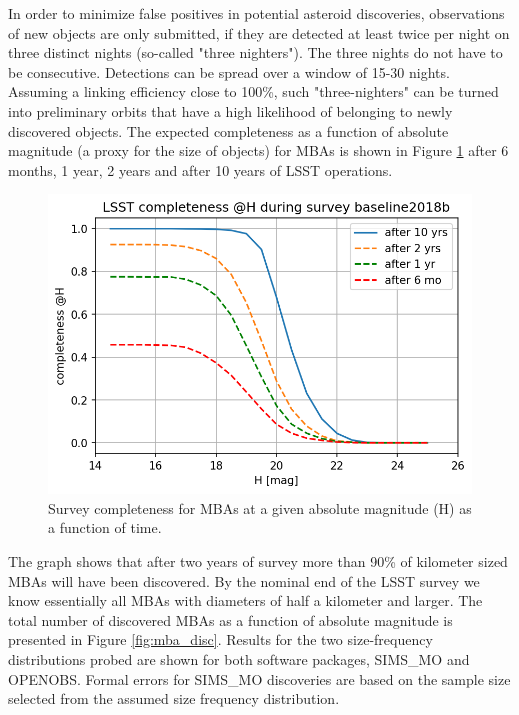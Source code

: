 In order to minimize false positives in potential asteroid discoveries, observations of new objects are only submitted, if they are detected at least twice per night on three distinct nights (so-called "three nighters"). The three nights do not have to be consecutive. Detections can be spread over a window of 15-30 nights. Assuming a linking efficiency close to 100\%, such "three-nighters" can be turned into preliminary orbits that have a high likelihood of belonging to newly discovered objects. 
The expected completeness as a function of absolute magnitude (a proxy for the size of objects) for MBAs is shown in Figure \ref{fig:mba_compl} after 6 months, 1 year, 2 years and after 10 years of \gls{LSST} operations.
\begin{figure}[b!]
\begin{center}
\includegraphics[scale=0.7]{figs/mba_completeness3.png}
\end{center}
\caption{Survey completeness for MBAs at a given absolute magnitude (H) as a function of time.}
\label{fig:mba_compl}       %
\end{figure}
%
The graph shows that after two years of survey more than 90\% of kilometer sized MBAs will have been discovered.
By the nominal end of the \gls{LSST} survey we know essentially all MBAs with diameters of half a kilometer and larger.
The total number of discovered MBAs as a function of absolute magnitude is presented in Figure \ref{fig:mba_disc}. Results for the two  size-frequency distributions probed are 
shown for both software packages, SIMS\_MO and OPENOBS. Formal errors for SIMS\_MO discoveries are based on the sample size selected from the assumed size frequency distribution.  
